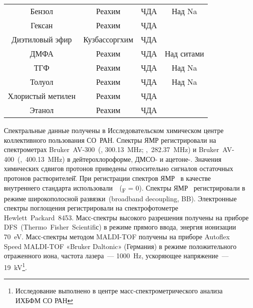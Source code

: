 \begin{table}[]
\begin{small}
\begin{tabular}{cccc}
            Бензол                & Реахим                 & ЧДА              & Над Na              \\
            Гексан                & Реахим                 & ЧДА              &                     \\
            Диэтиловый эфир       & Кузбассоргхим          & ЧДА              &                     \\
            ДМФА                  & Реахим                 & ЧДА              & Над ситами          \\
            ТГФ                   & Реахим                 & ЧДА              & Над Na              \\
            Толуол                & Реахим                 & ЧДА              & Над Na              \\
            Хлористый метилен     & Реахим                 & ЧДА              &                     \\
            Этанол                & Реахим                 & ЧДА              &                     \\
            \bottomrule
        \end{tabular}
    \end{small}
\end{table}

Спектральные данные получены в Исследовательском химическом центре коллективного пользования СО~РАН.
Спектры ЯМР регистрировали на спектрометрах Bruker~AV-300~(, \SI{300.13}{\mega\hertz}; ,~\SI{282.37}{\mega\hertz}) и Bruker~AV-400~(,~\SI{400.13}{\mega\hertz}) в дейтерохлороформе, \mbox{ДМСО-} и \mbox{ацетоне-}.
Значения химических сдвигов протонов приведены относительно сигналов остаточных протонов растворителей̆.
При регистрации спектров ЯМР~ в качестве внутреннего стандарта использовали~~(\chemdelta{}\textsubscript{F} = \SI{0}{\ppm}).
Спектры ЯМР~ регистрировали в режиме широкополосной развязки~(broadband decoupling, BB).
Электронные спектры поглощения регистрировали на спектрофотометре Hewlett~Packard~8453.
Масс-спектры высокого разрешения получены на приборе DFS~(Thermo~Fisher~Scientifiс) в режиме прямого ввода, энергия ионизации \SI{70}{\electronvolt}.
Масс-спектры методом  MALDI-TOF получены на приборе Autoflex Speed MALDI-TOF «Bruker Daltonic» (Германия) в режиме положительного отраженного иона, частота лазера~–-- \SI{1000}{\hertz}, ускоряющее напряжение~–-- \SI{19}{\kilo\volt}\footnote{Исследование выполнено в центре масс-спектрометрического анализа ИХБФМ СО РАН}.



